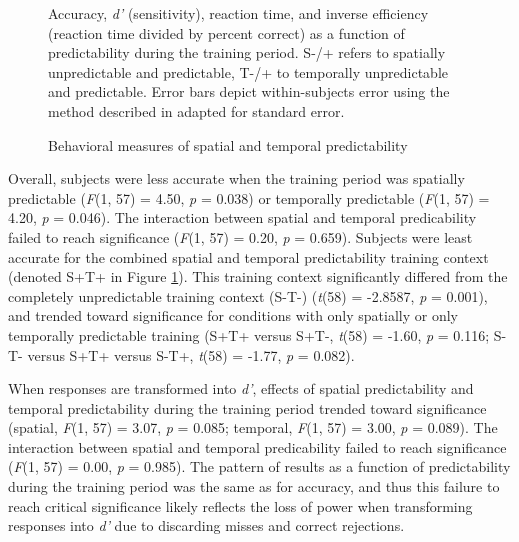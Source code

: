 \documentclass[dwyatte_dissertation.tex]{subfiles}
\begin{document}
\begin{figure}[h!]
\begin{center}
\begin{tabular}{ll}
\end{tabular}
\end{center}
\caption{Behavioral measures of spatial and temporal predictability}{Accuracy, \textit{d'} (sensitivity), reaction time, and inverse efficiency (reaction time divided by percent correct) as a function of predictability during the training period. S-/+ refers to spatially unpredictable and predictable, T-/+ to temporally unpredictable and predictable. Error bars depict within-subjects error using the method described in \protect{} adapted for standard error.}
\label{fig:bpleast_behave}
\end{figure}


Overall, subjects were less accurate when the training period was spatially predictable (\textit{F}(1, 57) = 4.50, \textit{p} = 0.038) or temporally predictable (\textit{F}(1, 57) = 4.20, \textit{p} = 0.046). The interaction between spatial and temporal predicability failed to reach significance (\textit{F}(1, 57) = 0.20, \textit{p} = 0.659). Subjects were least accurate for the combined spatial and temporal predictability training context (denoted S+T+ in Figure \ref{fig:bpleast_behave}). This training context significantly differed from the completely unpredictable training context (S-T-) (\textit{t}(58) = -2.8587, \textit{p} = 0.001), and trended toward significance for conditions with only spatially or only temporally predictable training (S+T+ versus S+T-, \textit{t}(58) = -1.60, \textit{p} = 0.116; S-T- versus S+T+ versus S-T+, \textit{t}(58) = -1.77, \textit{p} = 0.082).


When responses are transformed into \textit{d'}, effects of spatial predictability and temporal predictability during the training period trended toward significance (spatial, \textit{F}(1, 57) = 3.07, \textit{p} = 0.085; temporal, \textit{F}(1, 57) = 3.00, \textit{p} = 0.089). The interaction between spatial and temporal predicability failed to reach significance (\textit{F}(1, 57) = 0.00, \textit{p} = 0.985). The pattern of results as a function of predictability during the training period was the same as for accuracy, and thus this failure to reach critical significance likely reflects the loss of power when transforming responses into \textit{d'} due to discarding misses and correct rejections. 
\end{document}

